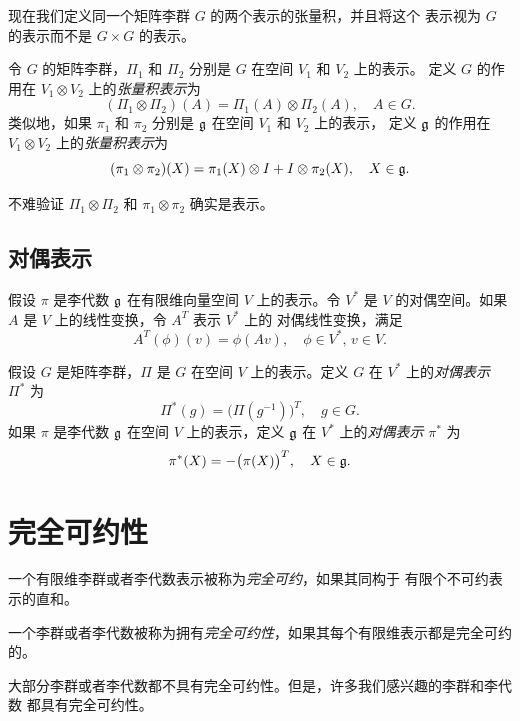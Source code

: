 现在我们定义同一个矩阵李群 $G$ 的两个表示的张量积，并且将这个
表示视为 $G$ 的表示而不是 $G\times G$ 的表示。

\begin{definition}
  令 $G$ 的矩阵李群，$\Pi_1$ 和 $\Pi_2$ 分别是 $G$ 在空间 $V_1$ 和 $V_2$ 上的表示。
  定义 $G$ 的作用在 $V_1\otimes V_2$ 上的\emph{张量积表示}为
  \[
    (\Pi_1\otimes \Pi_2)(A)=\Pi_1(A)\otimes \Pi_2(A),\quad A\in G.
  \]
  类似地，如果 $\pi_1$ 和 $\pi_2$ 分别是 $\mathfrak{g}$ 在空间 $V_1$ 和 $V_2$ 上的表示，
  定义 $\mathfrak{g}$ 的作用在 $V_1\otimes V_2$ 上的\emph{张量积表示}为
  \[
    (\pi_1\otimes \pi_2)(X)=\pi_1(X)\otimes I + I\otimes \pi_2(X),\quad X\in \mathfrak{g}.
  \]
\end{definition}

不难验证 $\Pi_1\otimes\Pi_2$ 和 $\pi_1\otimes\pi_2$ 确实是表示。

\subsection{对偶表示}

假设 $\pi$ 是李代数 $\mathfrak{g}$ 在有限维向量空间 $V$ 上的表示。令 $V^*$
是 $V$ 的对偶空间。如果 $A$ 是 $V$ 上的线性变换，令 $A^T$ 表示 $V^*$ 上的
对偶线性变换，满足
\[
  A^T(\phi)(v)=\phi(Av),\quad \phi\in V^*,\, v\in V.
\]

\begin{definition}
  假设 $G$ 是矩阵李群，$\Pi$ 是 $G$ 在空间 $V$ 上的表示。定义 $G$ 在
  $V^*$ 上的\emph{对偶表示} $\Pi^*$ 为
  \[
    \Pi^*(g)=\bigl(\Pi(g^{-1})\bigr)^T,\quad g\in G.
  \]
  如果 $\pi$ 是李代数 $\mathfrak{g}$ 在空间 $V$ 上的表示，定义 $\mathfrak{g}$ 在
  $V^*$ 上的\emph{对偶表示} $\pi^*$ 为
  \[
    \pi^*(X)=-\bigl(\pi(X)\bigr)^T,\quad X\in \mathfrak{g}.
  \]
\end{definition}

\section{完全可约性}

\begin{definition}
  一个有限维李群或者李代数表示被称为\emph{完全可约}，如果其同构于
  有限个不可约表示的直和。
\end{definition}

\begin{definition}
  一个李群或者李代数被称为拥有\emph{完全可约性}，如果其每个有限维表示都是完全可约的。
\end{definition}

大部分李群或者李代数都不具有完全可约性。但是，许多我们感兴趣的李群和李代数
都具有完全可约性。

